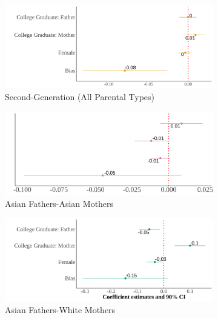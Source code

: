 \begin{center}
\begin{figure}[!htb]
\centering
\caption{Relationship Between Self-Reported Asian Identity and Bias: By Parental Types}
\label{plot01-regression-byparent}
\begin{subfigure}{.48\textwidth}
\caption{Second-Generation (All Parental Types)}
\centering
\includegraphics[width=.9\linewidth]{figure/by-parents-regs-all.png}
\end{subfigure}
\centering
\begin{subfigure}{.48\textwidth}
\caption{Asian Fathers-Asian Mothers}
\centering
\includegraphics[width=.9\linewidth]{figure/by-parents-regs-hh.png}
\end{subfigure}
\begin{subfigure}{.48\textwidth}
\caption{Asian Fathers-White Mothers}
\centering
\includegraphics[width=.9\linewidth]{figure/by-parents-regs-hw.png}
\end{subfigure}
\begin{subfigure}{.48\textwidth}

\end{subfigure}
\end{figure}
\end{center}
